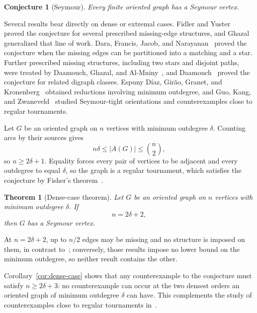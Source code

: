 \documentclass[10pt,a4paper]{amsart}
\newtheorem{theorem}{Theorem}[section]
\newtheorem*{conjecture}{Conjecture}
\begin{document}
\begin{conjecture}[Seymour]
Every finite oriented graph has a Seymour vertex.
\end{conjecture}

Several results bear directly on dense or extremal cases.  Fidler and
Yuster~\cite{FidlerYuster2007} proved the conjecture for several prescribed
missing-edge structures, and Ghazal~\cite{Ghazal2012} generalized that line of
work.  Dara, Francis, Jacob, and
Narayanan~\cite{DaraFrancisJacobNarayanan2022} proved the conjecture when the
missing edges can be partitioned into a matching and a star.  Further
prescribed missing structures, including two stars and disjoint paths, were
treated by Daamouch, Ghazal, and
Al-Mniny~\cite{DaamouchGhazalAlMniny2024}, and Daamouch~\cite{Daamouch2021}
proved the conjecture for related digraph classes.  Espuny D\'iaz, Gir\~ao,
Granet, and Kronenberg~\cite{EspunyDiazEtAl2024} obtained reductions involving
minimum outdegree, and Guo, Kang, and Zwaneveld~\cite{GuoKangZwaneveld2026}
studied Seymour-tight orientations and counterexamples close to regular
tournaments.

Let $G$ be an oriented graph on $n$ vertices with minimum outdegree $\delta$. Counting arcs by their sources gives
\[
 n\delta\le|A(G)|\le\binom n2,
\]
so $n\ge2\delta+1$. Equality forces every pair of vertices to be adjacent and every outdegree to equal $\delta$, so the graph is a regular tournament, which satisfies the conjecture by Fisher's theorem~\cite{Fisher1996}.



\begin{theorem}[Dense-case theorem]\label{thm:fixed-target}
Let $G$ be an oriented graph on $n$ vertices with minimum outdegree $\delta$.
If
\[
 n=2\delta+2,
\]
then $G$ has a Seymour vertex.
\end{theorem}


At $n=2\delta+2$, up to $n/2$ edges may be missing and no structure is
imposed on them, in contrast
to~\cite{Daamouch2021,DaamouchGhazalAlMniny2024,DaraFrancisJacobNarayanan2022,FidlerYuster2007,Ghazal2012};
conversely, those results impose no lower bound on the minimum outdegree, so
neither result contains the other.

Corollary~\ref{cor:dense-case} shows that any counterexample to the
conjecture must satisfy $n\ge2\delta+3$: no counterexample can occur at the
two densest orders an oriented graph of minimum outdegree $\delta$ can have.
This complements the study of counterexamples close to regular tournaments
in~\cite{GuoKangZwaneveld2026}.
\end{document}
